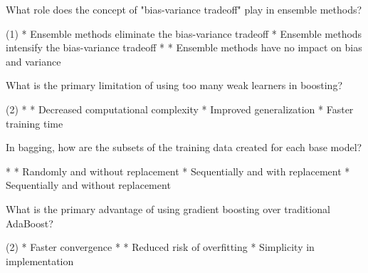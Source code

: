 \documentclass[10pt]{extarticle}
\begin{document}
\begin{exercise}
    What role does the concept of "bias-variance tradeoff" play in ensemble methods?
    \begin{choice} (1)
        * Ensemble methods eliminate the bias-variance tradeoff
        * Ensemble methods intensify the bias-variance tradeoff
        * 
        * Ensemble methods have no impact on bias and variance
    \end{choice}
\end{exercise}
\begin{solution}
\end{solution}

\begin{exercise}
    What is the primary limitation of using too many weak learners in boosting?
    \begin{choice} (2)
        * 
        * Decreased computational complexity
        * Improved generalization
        * Faster training time
    \end{choice}
\end{exercise}
\begin{solution}
\end{solution}

\begin{exercise}
    In bagging, how are the subsets of the training data created for each base model?
    \begin{choice}
        * 
        * Randomly and without replacement
        * Sequentially and with replacement
        * Sequentially and without replacement
    \end{choice}
\end{exercise}
\begin{solution}
\end{solution}

\begin{exercise}
    What is the primary advantage of using gradient boosting over traditional AdaBoost?
    \begin{choice} (2)
        * Faster convergence
        * 
        * Reduced risk of overfitting
        * Simplicity in implementation
    \end{choice}
\end{exercise}
\begin{solution}
\end{solution}
\end{document}
